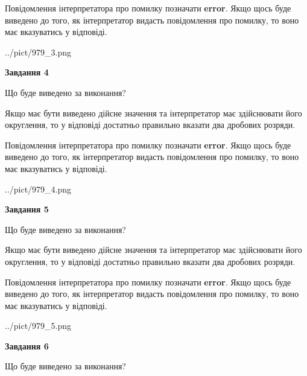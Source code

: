 \documentclass[12pt, ukrainian]{article}
\begin{document}
{\begin {Large}
Повідомлення інтерпретатора про помилку позначати \textbf{error}.
Якщо щось буде виведено до того, як інтерпретатор видасть повідомлення про помилку, 
то воно має вказуватись у відповіді. \par

\begin{center}
	{../pict/979_3.png}
\end{center}
\newpage

{\begin {center}\textbf{Завдання 4}\end {center}}\par
Що буде виведено за виконання? \par

Якщо має бути виведено дійсне значення та інтерпретатор має здійснювати його округлення, 
то у відповіді достатньо правильно вказати два дробових розряди.

Повідомлення інтерпретатора про помилку позначати \textbf{error}.
Якщо щось буде виведено до того, як інтерпретатор видасть повідомлення про помилку, 
то воно має вказуватись у відповіді. \par

\begin{center}
	{../pict/979_4.png}
\end{center}
\newpage

{\begin {center}\textbf{Завдання 5}\end {center}}\par
Що буде виведено за виконання? \par

Якщо має бути виведено дійсне значення та інтерпретатор має здійснювати його округлення, 
то у відповіді достатньо правильно вказати два дробових розряди.

Повідомлення інтерпретатора про помилку позначати \textbf{error}.
Якщо щось буде виведено до того, як інтерпретатор видасть повідомлення про помилку, 
то воно має вказуватись у відповіді. \par

\begin{center}
	{../pict/979_5.png}
\end{center}
\newpage

{\begin {center}\textbf{Завдання 6}\end {center}}\par
Що буде виведено за виконання? \par


\end{Large}}
\end{document}
